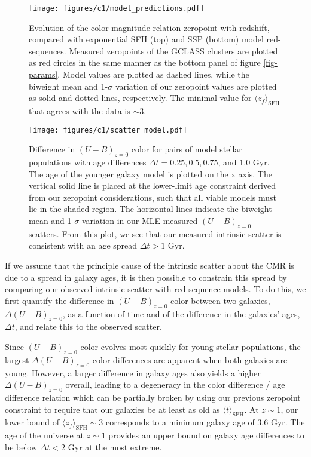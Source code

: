 \begin{figure}
\texttt{[image: figures/c1/model\_predictions.pdf]}
\caption[Using the color-magnitude relation zeropoint to constrain red-sequence formation redshift]{Evolution of the color-magnitude relation zeropoint with redshift, compared with exponential SFH (top) and SSP (bottom) model red-sequences. Measured zeropoints of the GCLASS clusters are plotted as red circles in the same manner as the bottom panel of figure \ref{fig-params}. Model values are plotted as dashed lines, while the biweight mean and 1-$\sigma$ variation of our zeropoint values are plotted as solid and dotted lines, respectively. The minimal value for $\langle z_f \rangle_\mathrm{SFH}$ that agrees with the data is $\sim 3$.
\label{fig-models}}
\end{figure}

\begin{figure}
\texttt{[image: figures/c1/scatter\_model.pdf]}
\caption[Using the color-magnitude relation scatter to constrain scatter in red-sequence ages]{Difference in $(U-B)_{z=0}$ color for pairs of model stellar populations with age differences $\Delta t = 0.25, 0.5, 0.75$, and $1.0$ Gyr. The age of the younger galaxy model is plotted on the x axis. The vertical solid line is placed at the lower-limit age constraint derived from our zeropoint considerations, such that all viable models must lie in the shaded region. The horizontal lines indicate the biweight mean and 1-$\sigma$ variation in our MLE-measured $(U-B)_{z=0}$ scatters. From this plot, we see that our measured intrinsic scatter is consistent with an age spread $\Delta t > 1$ Gyr.
\label{fig-scatmodel}}
\end{figure}

If we assume that the principle cause of the intrinsic scatter about the CMR is due to a spread in galaxy ages, it is then possible to constrain this spread by comparing our observed intrinsic scatter with red-sequence models. To do this, we first quantify the difference in $(U-B)_{z=0}$ color between two galaxies, $\Delta(U-B)_{z=0}$, as a function of time and of the difference in the galaxies' ages, $\Delta t$, and relate this to the observed scatter.

Since $(U-B)_{z=0}$ color evolves most quickly for young stellar populations, the largest $\Delta(U-B)_{z=0}$ color differences are apparent when both galaxies are young.
However, a larger difference in galaxy ages also yields a higher $\Delta(U-B)_{z=0}$ overall, leading to a degeneracy in the color difference / age difference relation which can be partially broken by using our previous zeropoint constraint to require that our galaxies be at least as old as $\langle t \rangle_\mathrm{SFH}$.
At $z \sim 1$, our lower bound of $\langle z_f \rangle_\mathrm{SFH} \sim 3$ corresponds to a minimum galaxy age of 3.6 Gyr.
The age of the universe at $z \sim 1$ provides an upper bound on galaxy age differences to be below $\Delta t < 2 $ Gyr at the most extreme.

